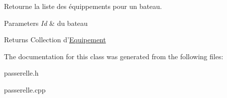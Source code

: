 Retourne la liste des équippements pour un bateau. 


\begin{DoxyParams}{Parameters}
{\em Id} & du bateau \\
\hline
\end{DoxyParams}
\begin{DoxyReturn}{Returns}
Collection d'\hyperlink{class_equipement}{Equipement} 
\end{DoxyReturn}


The documentation for this class was generated from the following files\-:\begin{DoxyCompactItemize}
\item 
passerelle.\-h\item 
passerelle.\-cpp\end{DoxyCompactItemize}
